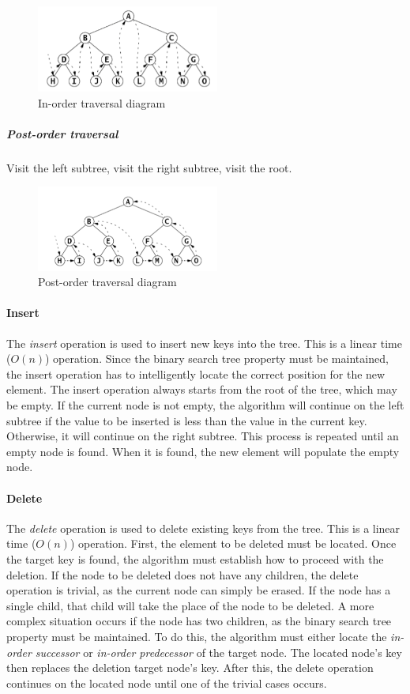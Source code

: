 \documentclass{article}
\begin{document}
\begin{figure}[H]
  \centering
  \includegraphics[width=6cm]{in_order_traversal}
  \caption{In-order traversal diagram}
\end{figure}

\subparagraph{Post-order traversal}
Visit the left subtree, visit the right subtree, visit the root.

\begin{figure}[H]
  \centering
  \includegraphics[width=6cm]{post_order_traversal}
  \caption{Post-order traversal diagram}
\end{figure}


\newpage


\paragraph{Insert}
The {\em insert} operation is used to insert new keys into the tree. This is a linear time (\(O(n)\)) operation.
Since the binary search tree property must be maintained, the insert operation has to intelligently locate the
correct position for the new element. The insert operation always starts from the root of the tree,
which may be empty. If the current node is not empty, the algorithm will continue on the left subtree if
the value to be inserted is less than the value in the current key. Otherwise, it will continue on the right
subtree. This process is repeated until an empty node is found. When it is found, the new element will populate
the empty node.

\paragraph{Delete}
The {\em delete} operation is used to delete existing keys from the tree. This is a linear time (\(O(n)\))
operation. First, the element to be deleted must be located. Once the target key is found, the algorithm must
establish how to proceed with the deletion. If the node to be deleted does not have any children, the delete
operation is trivial, as the current node can simply be erased. If the node has a single child, that child will
take the place of the node to be deleted. A more complex situation occurs if the node has two children, as the
binary search tree property must be maintained. To do this, the algorithm must either locate the
{\em in-order successor} or {\em in-order predecessor} of the target node. The located node's key then replaces
the deletion target node's key. After this, the delete operation continues on the located node until one of the
trivial cases occurs.
\end{document}
